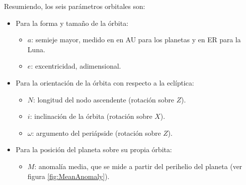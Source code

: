 \documentclass[a4paper,10pt]{article}
\begin{document}
Resumiendo, los seis parámetros orbitales son:
\begin{itemize}
  \item Para la forma y tamaño de la órbita:
  \begin{itemize}
  \item \textbf{$a$}: semieje mayor, medido en en AU para los planetas y en ER para la Luna.
  \item \textbf{$e$}: excentricidad, adimensional.
  \end{itemize}
  \item Para la orientación de la órbita con respecto a la eclíptica:
  \begin{itemize}
  \item \textbf{$N$}: longitud del nodo ascendente (rotación sobre $Z$).
  \item \textbf{$i$}: inclinación de la órbita (rotación sobre $X$).
  \item \textbf{$\omega$}: argumento del periápside (rotación sobre $Z$). 
  \end{itemize}
  \item Para la posición del planeta sobre su propia órbita:
  \begin{itemize}
  \item \textbf{$M$}: anomalía media, que se mide a partir del perihelio del planeta (ver figura \ref{fig:MeanAnomaly}).
  \end{itemize}
\end{itemize}
\end{document}
